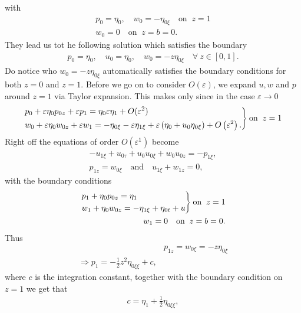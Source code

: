 with
\begin{align}
    p_0 = \eta_0, \quad w_0 = -\eta_{0\xi} \quad \text{on}\;\; z=1\\
    w_0 = 0 \quad \text{on}\;\; z=b=0.
\end{align}
They lead us tot he following solution which satisfies the boundary
\begin{align}
    p_0 = \eta_0, \quad u_0 = \eta_0, \quad w_0 = -z\eta_{0\xi} \quad
    \forall\ z\in[0, 1].
\end{align}
Do notice who $w_0 = -z\eta_{0\xi}$ automatically satisfies the boundary
conditions for both $z=0$ and $z=1$. Before we go on to consider
$O(\varepsilon)$, we expand $u, w$ and $p$ around $z=1$ via Taylor expansion.
This makes only since in the case $\varepsilon\rightarrow 0$
\begin{align}
    \begin{drcases}
    p_0 + \varepsilon\eta_0 p_{0z} + \varepsilon p_1 = \eta_0
    \varepsilon\eta_1 + O(\varepsilon^2)\\
    w_0 +\varepsilon\eta_0w_{0z} + \varepsilon w_1 = -\eta_{0\xi} -
    \varepsilon\eta_{1\xi} + \varepsilon\left( \eta_0 + u_0 \eta_{0\xi}
    \right) +O\left(\varepsilon^2  \right).
    \end{drcases} \text{on}\;\; z=1
\end{align}
Right off the equations of order $O(\varepsilon^1)$ become
\begin{align}
    -u_{1\xi} + u_{0\tau} + u_0u_{0\xi} + w_{0}u_{0z} = -p_{1\xi},\\
    p_{1z} = w_{0\xi} \quad \text{and} \quad u_{1\xi} + w_{1z} = 0,
\end{align}
with the boundary conditions
\begin{align}
    \begin{drcases}
        p_1 + \eta_0 p_{0z} = \eta_1\\
        w_1 + \eta_0 w_{0z} = -\eta_{1\xi} + \eta_{0t} + u
    \end{drcases}
    \text{on}\;\; z=1\\
    w_1 = 0 \quad \text{on}\;\; z =b = 0.
\end{align}
Thus
\begin{align}
    &p_{1z} = w_{0\xi} = -z\eta_{0\xi}\\
    \Rightarrow p_1 = -\frac{1}{2}z^2 \eta_{0\xi\xi} +c,
\end{align}
where $c$ is the integration constant, together with the boundary condition
on $z=1$ we get that
\begin{align}
    c = \eta_1 + \frac{1}{2} \eta_{0\xi\xi},
\end{align}
